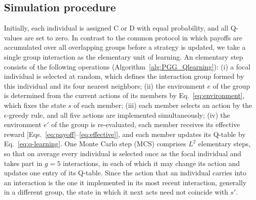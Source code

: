 \documentclass[%
  aip,cha,
  amsmath,amssymb,
  reprint,
  article-title,
]{revtex4-2}
\begin{document}
\subsection{Simulation procedure}\label{sec:simulation}

Initially, each individual is assigned $\mathrm{C}$ or $\mathrm{D}$ with equal probability, and all Q-values are set to zero. In contrast to the common protocol in which payoffs are accumulated over all overlapping groups before a strategy is updated,\cite{szolnoki2009impact,perc2013evolutionary} we take a single group interaction as the elementary unit of learning. An elementary step consists of the following operations (Algorithm~\ref{alg:PGG_Qlearning}):
(i) a focal individual is selected at random, which defines the interaction group formed by this individual and its four nearest neighbors;
(ii) the environment $e$ of the group is determined from the current actions of its members by Eq.~\eqref{eq:environment}, which fixes the state $s$ of each member;
(iii) each member selects an action by the $\epsilon$-greedy rule, and all five actions are implemented simultaneously;
(iv) the environment $e'$ of the group is re-evaluated, each member receives its effective reward [Eqs.~\eqref{eq:payoff}--\eqref{eq:effective}], and each member updates its Q-table by Eq.~\eqref{eq:q-learning}.
One Monte Carlo step (MCS) comprises $L^2$ elementary steps, so that on average every individual is selected once as the focal individual and takes part in $g=5$ interactions, in each of which it may change its action and updates one entry of its Q-table. Since the action that an individual carries into an interaction is the one it implemented in its most recent interaction, generally in a different group, the state in which it next acts need not coincide with $s'$.
\end{document}
